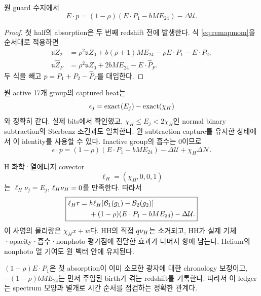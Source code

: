 \begin{theorem}\label{thm:energy}
원 guard 수지에서
\begin{equation}
\boxed{E\cdot p
=(1-\rho)(E\cdot P_1-bME_{24})-\Delta\mathcal U.}
\label{eq:energy_ledger}
\end{equation}
\end{theorem}
\begin{proof}
첫 half의 absorption은 두 번째 redshift 전에 발생한다. 식
\eqref{eq:remapmom}을 순서대로 적용하면
\begin{align*}
\mathfrak uZ_2
&=\rho^2\mathfrak uZ_0+b(\rho+1)ME_{24}
-\rho E\cdot P_1-E\cdot P_2,\\
\mathfrak u\widehat Z_F
&=\rho^2\mathfrak uZ_0+2bME_{24}-E\cdot\widehat P_F.
\end{align*}
두 식을 빼고 $p=P_1+P_2-\widehat P_F$를 대입한다.
\end{proof}

원 active 17개 group의 captured heat는
\begin{equation}
\epsilon_j=\operatorname{exact}(E_j)-\operatorname{exact}(\chi_H)
\label{eq:heat_identity}
\end{equation}
와 정확히 같다. 실제 bits에서 확인했고,
$\chi_H\le E_j<2\chi_H$인 normal binary subtraction의 Sterbenz 조건과도 일치한다.
원 subtraction capture를 유지한 상태에서 이 identity를 사용할 수 있다.
Inactive group의 흡수는 0이므로
\begin{equation}
\epsilon\cdot p
=(1-\rho)(E\cdot P_1-bME_{24})
-\Delta\mathcal U+\chi_H\Delta\mathcal N.
\label{eq:thermal_ledger}
\end{equation}

H 화학·열에너지 covector
\begin{equation}
\ell_H=(\chi_H,0,0,1)
\end{equation}
는 $\ell_H\nu_j=E_j$, $\ell_H\nu_H=0$를 만족한다.
따라서
\begin{equation}
\boxed{\begin{aligned}
\ell_Hr={}&h\ell_H[\mathcal B_1(g_1)-\mathcal B_2(g_2)]\\
&+(1-\rho)(E\cdot P_1-bME_{24})-\Delta\mathcal U.
\end{aligned}}
\label{eq:Henergy}
\end{equation}
이 사영의 물리량은 $\chi_Hx+w$다.
HH의 직접 $q\nu_H$는 소거되고, HH가 실제 기체·opacity·흡수·nonphoto 평가점에 전달한 효과가 나머지 항에 남는다.
Helium의 nonphoto 열 기여도 원 벡터 안에 유지된다.

$(1-\rho)E\cdot P_1$은 첫 absorption이 이미 소모한 광자에 대한 chronology 보정이고,
$-(1-\rho)bME_{24}$는 먼저 주입된 birth가 겪는 redshift를 기록한다.
따라서 이 ledger는 spectrum 모양과 별개로 시간 순서를 점검하는 정확한 관계다.

